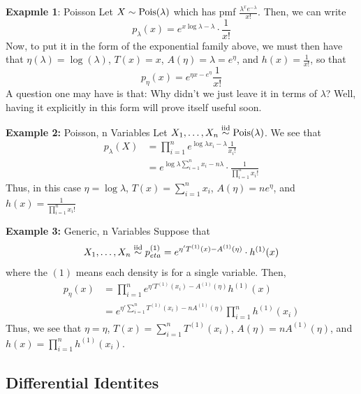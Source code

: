\begin{example}{\textbf{Exapmle 1}: Poisson}
    Let $X \sim \text{Pois}(\lambda)$ which has pmf $\frac{\lambda^{x}e^{-\lambda}}{x!}$. Then, we can write
    \[ p_{\lambda}(x) = e^{x\log\lambda - \lambda} \cdot \frac{1}{x!} \]
    Now, to put it in the form of the exponential family above, we must then have that $\eta(\lambda) = \log(\lambda)$, $T(x) = x$, $A(\eta) = \lambda = e^{\eta}$, and $h(x) = \frac{1}{x!}$, so that
    \[ p_{\eta}(x) = e^{\eta x - e^{\eta}} \frac{1}{x!} \]
    A question one may have is that: Why didn't we just leave it in terms of $\lambda$? Well, having it explicitly in this form will prove itself useful soon.
\end{example}

\begin{example}{\textbf{Example 2:} Poisson, n Variables}
    Let $X_1, \ldots, X_n \overset{\text{iid}}{\sim} \text{Pois}(\lambda)$. We see that
    \begin{align*}
        p_{\lambda}(X) &= \prod_{i = 1}^{n} e^{\log \lambda x_i - \lambda} \frac{1}{x_i!}\\
        &= e^{\log \lambda \sum_{i = 1}^{n}x_i - n\lambda} \cdot \frac{1}{\prod_{i = 1}^{n} x_i!}
    \end{align*}
    Thus, in this case $\eta = \log \lambda$, $T(x) = \sum_{i = 1}^{n} x_i$, $A(\eta) = ne^{\eta}$, and $h(x) = \frac{1}{\prod_{i = 1}^{n} x_i!}$
\end{example}

\begin{example}{\textbf{Example 3:} Generic, n Variables}
    Suppose that 
    \[ X_1, \ldots, X_n \overset{\text{iid}}{\sim} p_{eta}^{(1)} = e^{\eta'T^{(1)}(x) - A^{(1)}(\eta)} \cdot h^{(1)}(x) \]
    where the $(1)$ means each density is for a single variable. Then,
    \begin{align*}
        p_{\eta}(x) &= \prod_{i = 1}^{n} e^{\eta'T^{(1)}(x_i) - A^{(1)}(\eta)}h^{(1)}(x)\\
        &= e^{\eta'\sum_{i = 1}^{n} T^{(1)}(x_i) - nA^{(1)}(\eta)}\prod_{i =1}^{n} h^{(1)}(x_i)
    \end{align*}
    Thus, we see that $\eta = \eta$, $T(x) = \sum_{i = 1}^{n}T^{(1)}(x_i)$, $A(\eta) = nA^{(1)}(\eta)$, and $h(x) = \prod_{i = 1}^{n} h^{(1)}(x_i)$. 
\end{example}

\subsection*{Differential Identites}
\sectionspace

